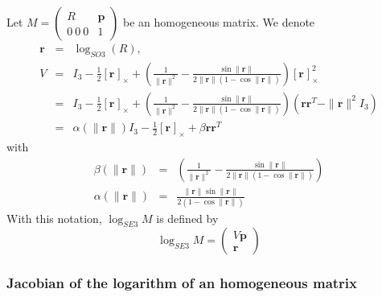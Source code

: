 \documentclass {article}
\newcommand\rot{\mathbf{r}}
\newcommand\rcross[1]{[\rot_{#1}]_{\times}}
\newcommand\normr{\|\rot\|}
\newcommand\logSO[1]{\log_{SO#1}}
\newcommand\logSE[1]{\log_{SE#1}}
\begin{document}
Let $M = \left(\begin {array}{cc} R& \mathbf{p} \\ 0\ 0\ 0 & 1\end{array}\right)$ be an homogeneous matrix.
We denote
\begin{eqnarray}
\mathbf{r} &=& \logSO{3} (R),\\
\label{eq:V}
V &=& I_3 -\frac{1}{2}\rcross{} +  \left(\frac{1}{\normr^2} - \frac{\sin\normr}{2\normr(1-\cos\normr)}\right)\rcross{}^2\\
&=&I_3 -\frac{1}{2}\rcross{} +  \left(\frac{1}{\normr^2} - \frac{\sin\normr}{2\normr(1-\cos\normr)}\right)(\mathbf{r}\mathbf{r}^T - \normr^2 I_3)\\
&=& \alpha (\normr)I_3 - \frac{1}{2}\rcross{} + \beta \mathbf{r}\mathbf{r}^T
\end{eqnarray}
with
\begin{eqnarray}
\beta(\normr)&=&\left(\frac{1}{\normr^2} - \frac{\sin\normr}{2\normr(1-\cos\normr)}\right)\\
\alpha (\normr) &=& \frac{\normr\sin\normr}{2(1-\cos\normr)}
\end{eqnarray}
With this notation, $\logSE{3} M$ is defined by
\begin{equation}\label{eq:logSE3}
\logSE{3} M = \left(\begin{array}{c} V\mathbf{p} \\ \mathbf{r}\end{array}\right)
\end{equation}

\subsubsection {Jacobian of the logarithm of an homogeneous matrix}
\end{document}
